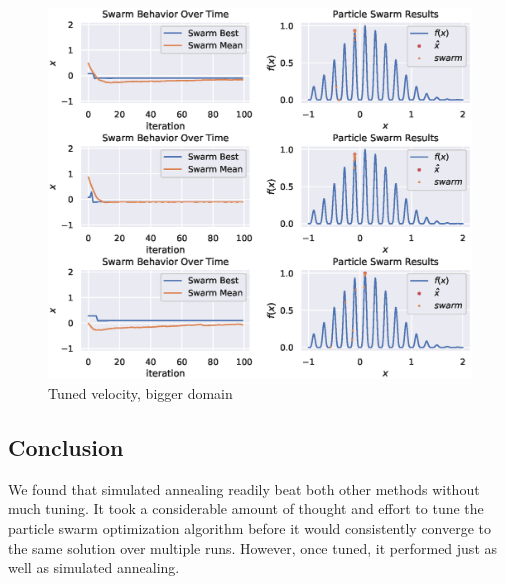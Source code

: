 \documentclass[12pt]{article}
\begin{document}
\begin{figure}[H]
    \centering
    \includegraphics[width=\textwidth]{figures/pso-tuned-vel-bigger-domain.eps}
    \caption{Tuned velocity, bigger domain}\label{fig:pso:tuned-vel-bigger-domain}
\end{figure}

\subsection{Conclusion}
We found that simulated annealing readily beat both other methods without much tuning.
It took a considerable amount of thought and effort to tune the particle swarm optimization algorithm before it would consistently converge to the same solution over multiple runs.
However, once tuned, it performed just as well as simulated annealing.
\end{document}
